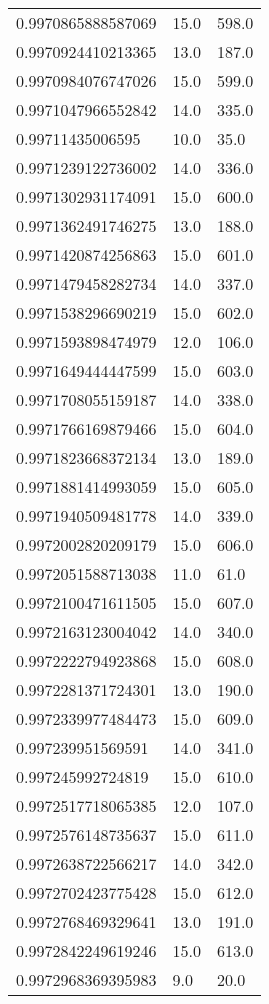 \begin{center}
\begin{supertabular}[H]{p{0.30\textwidth}p{0.05\textwidth}p{0.05\textwidth}}
0.9970865888587069 & 15.0 & 598.0 \\ 
0.9970924410213365 & 13.0 & 187.0 \\ 
0.9970984076747026 & 15.0 & 599.0 \\ 
0.9971047966552842 & 14.0 & 335.0 \\ 
0.99711435006595 & 10.0 & 35.0 \\ 
0.9971239122736002 & 14.0 & 336.0 \\ 
0.9971302931174091 & 15.0 & 600.0 \\ 
0.9971362491746275 & 13.0 & 188.0 \\ 
0.9971420874256863 & 15.0 & 601.0 \\ 
0.9971479458282734 & 14.0 & 337.0 \\ 
0.9971538296690219 & 15.0 & 602.0 \\ 
0.9971593898474979 & 12.0 & 106.0 \\ 
0.9971649444447599 & 15.0 & 603.0 \\ 
0.9971708055159187 & 14.0 & 338.0 \\ 
0.9971766169879466 & 15.0 & 604.0 \\ 
0.9971823668372134 & 13.0 & 189.0 \\ 
0.9971881414993059 & 15.0 & 605.0 \\ 
0.9971940509481778 & 14.0 & 339.0 \\ 
0.9972002820209179 & 15.0 & 606.0 \\ 
0.9972051588713038 & 11.0 & 61.0 \\ 
0.9972100471611505 & 15.0 & 607.0 \\ 
0.9972163123004042 & 14.0 & 340.0 \\ 
0.9972222794923868 & 15.0 & 608.0 \\ 
0.9972281371724301 & 13.0 & 190.0 \\ 
0.9972339977484473 & 15.0 & 609.0 \\ 
0.997239951569591 & 14.0 & 341.0 \\ 
0.997245992724819 & 15.0 & 610.0 \\ 
0.9972517718065385 & 12.0 & 107.0 \\ 
0.9972576148735637 & 15.0 & 611.0 \\ 
0.9972638722566217 & 14.0 & 342.0 \\ 
0.9972702423775428 & 15.0 & 612.0 \\ 
0.9972768469329641 & 13.0 & 191.0 \\ 
0.9972842249619246 & 15.0 & 613.0 \\ 
0.9972968369395983 & 9.0 & 20.0 \\ 

\end{supertabular}
\end{center}
